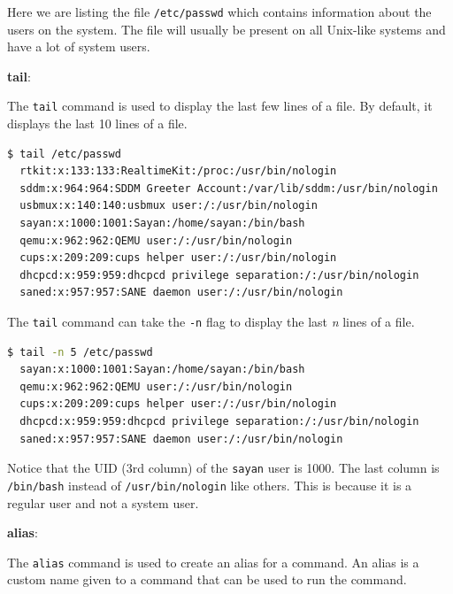 \begin{remark}
  Here we are listing the file \texttt{/etc/passwd} which contains information about the users on the system.
  The file will usually be present on all Unix-like systems and have a lot of system users.
\end{remark}

\textbf{tail}:

The \texttt{tail} command is used to display the last few lines of a file.
By default, it displays the last 10 lines of a file.

\begin{lstlisting}[language=bash]
  $ tail /etc/passwd
  rtkit:x:133:133:RealtimeKit:/proc:/usr/bin/nologin
  sddm:x:964:964:SDDM Greeter Account:/var/lib/sddm:/usr/bin/nologin
  usbmux:x:140:140:usbmux user:/:/usr/bin/nologin
  sayan:x:1000:1001:Sayan:/home/sayan:/bin/bash
  qemu:x:962:962:QEMU user:/:/usr/bin/nologin
  cups:x:209:209:cups helper user:/:/usr/bin/nologin
  dhcpcd:x:959:959:dhcpcd privilege separation:/:/usr/bin/nologin
  saned:x:957:957:SANE daemon user:/:/usr/bin/nologin
\end{lstlisting}

The \texttt{tail} command can take the \texttt{-n} flag to display the last \textit{n} lines of a file.

\begin{lstlisting}[language=bash]
  $ tail -n 5 /etc/passwd
  sayan:x:1000:1001:Sayan:/home/sayan:/bin/bash
  qemu:x:962:962:QEMU user:/:/usr/bin/nologin
  cups:x:209:209:cups helper user:/:/usr/bin/nologin
  dhcpcd:x:959:959:dhcpcd privilege separation:/:/usr/bin/nologin
  saned:x:957:957:SANE daemon user:/:/usr/bin/nologin
\end{lstlisting}

\begin{exercise}
  Notice that the UID (3rd column) of the \texttt{sayan} user is 1000.
  The last column is \texttt{/bin/bash} instead of \texttt{/usr/bin/nologin} like others.
  This is because it is a regular user and not a system user.
\end{exercise}

\textbf{alias}:

The \texttt{alias} command is used to create an alias for a command.
An alias is a custom name given to a command that can be used to run the command.

